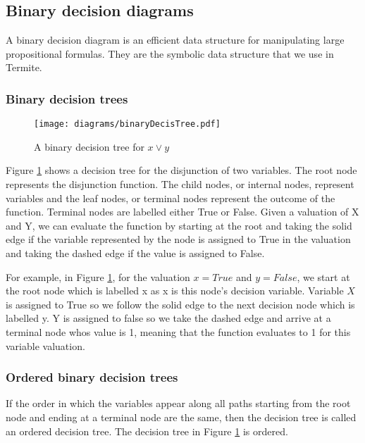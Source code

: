 
\subsection{Binary decision diagrams}

A binary decision diagram is an efficient data structure for manipulating large propositional formulas. They are the symbolic data structure that we use in Termite.

\subsubsection{Binary decision trees}

\begin{figure}[t]
\centering
\texttt{[image: diagrams/binaryDecisTree.pdf]}
\caption{A binary decision tree for $x \vee y$}
\label{fig:decis_tree}
\end{figure}

Figure \ref{fig:decis_tree} shows a decision tree for the disjunction of two variables. The root node represents the disjunction function. The child nodes, or internal nodes, represent variables and the leaf nodes, or terminal nodes represent the outcome of the function. Terminal nodes are labelled either True or False. Given a valuation of X and Y, we can evaluate the function by starting at the root and taking the solid edge if the variable represented by the node is assigned to True in the valuation and taking the dashed edge if the value is assigned to False. 

For example, in Figure \ref{fig:decis_tree}, for the valuation $x=True$ and $y=False$, we start at the root node which is labelled x as x is this node's decision variable. Variable $X$ is assigned to True so we follow the solid edge to the next decision node which is labelled y. Y is assigned to false so we take the dashed edge and arrive at a terminal node whos value is 1, meaning that the function evaluates to 1 for this variable valuation.

\subsubsection{Ordered binary decision trees}

If the order in which the variables appear along all paths starting from the root node and ending at a terminal node are the same, then the decision tree is called an ordered decision tree. The decision tree in Figure \ref{fig:decis_tree} is ordered.

